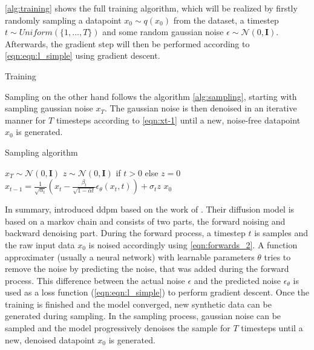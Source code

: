 \autoref{alg:training} shows the full training algorithm, which will be realized by firstly randomly sampling a datapoint $x_0 \sim q(x_0)$ from the dataset, a timestep $t\sim Uniform(\{1, ..., T\})$ and some random gaussian noise $\epsilon \sim \mathcal{N}(0, \textbf{I})$.
Afterwards, the gradient step will then be performed according to \autoref{eqn:eqn:l_simple} using gradient descent.

\begin{algorithm}
  \caption[Training]{Training \cite[p. 4]{ho2020DenoisingDiffusionProbabilistic}}
  \label{alg:training}
\end{algorithm}


Sampling on the other hand follows the algorithm \autoref{alg:sampling}, starting with sampling gaussian noise $x_T$.
The gaussian noise is then denoised in an iterative manner for $T$ timesteps according to \autoref{eqn:xt-1} until a new, noise-free datapoint $x_0$ is generated.

\begin{algorithm}
\caption[Sampling algorithm]{Sampling algorithm \cite[p. 4]{ho2020DenoisingDiffusionProbabilistic}}
  \label{alg:sampling}
  \begin{algorithmic}
  \State $x_T \sim \mathcal{N}(0, \mathbf{I})$
  \State $z \sim \mathcal{N}(0, \mathbf{I})$ if $t > 0$ else $z = 0$
  \State $x_{t-1} = \frac{1}{\sqrt{\alpha_t}}\left(x_t - \frac{\beta_t}{\sqrt{1-\bar{\alpha}t}}\epsilon_{\theta}(x_t,t)\right) + \sigma_t z$
  \EndFor
  \State \Return $x_0$
  \end{algorithmic}
\end{algorithm}

In summary, \cite{ho2020DenoisingDiffusionProbabilistic} introduced \gls{ddpm} based on the work of \cite{sohl-dickstein2015DeepUnsupervisedLearning}.
Their diffusion model is based on a markov chain and consists of two parts, the forward noising and backward denoising part.
During the forward process, a timestep $t$ is samples and the raw input data $x_0$ is noised accordingly using \autoref{eqn:forwards_2}.
A function approximater (usually a neural network) with learnable parameters $\theta$ tries to remove the noise by predicting the noise, that was added during the forward process.
This difference between the actual noise $\epsilon$ and the predicted noise $\epsilon_{\theta}$ is used as a loss function (\autoref{eqn:eqn:l_simple}) to perform gradient descent.
Once the training is finished and the model converged, new synthetic data can be generated during sampling.
In the sampling process, gaussian noise can be sampled and the model progressively denoises the sample for $T$ timesteps until a new, denoised datapoint $x_0$ is generated.


